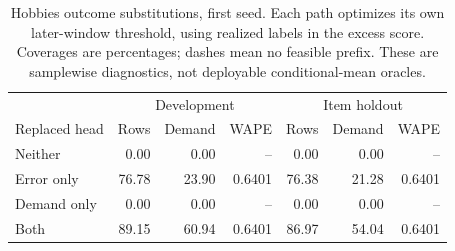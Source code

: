\begin{table}[htbp]
\centering\small
\caption{Hobbies outcome substitutions, first seed. Each path optimizes its own later-window threshold, using realized labels in the excess score. Coverages are percentages; dashes mean no feasible prefix. These are samplewise diagnostics, not deployable conditional-mean oracles.}
\label{tab:partialoracles}
\begin{tabular}{lrrr rrr}\toprule
&\multicolumn{3}{c}{Development}&\multicolumn{3}{c}{Item holdout}\\
Replaced head&Rows&Demand&WAPE&Rows&Demand&WAPE\\\midrule
Neither&0.00&0.00&--&0.00&0.00&--\\
Error only&76.78&23.90&0.6401&76.38&21.28&0.6401\\
Demand only&0.00&0.00&--&0.00&0.00&--\\
Both&89.15&60.94&0.6401&86.97&54.04&0.6401\\
\bottomrule\end{tabular}
\end{table}
